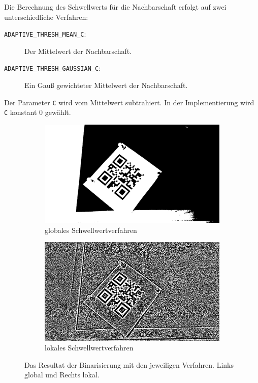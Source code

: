 Die Berechnung des Schwellwerts für die Nachbarschaft erfolgt auf zwei unterschiedliche Verfahren:
\begin{description}
	\item[\texttt{ADAPTIVE\_THRESH\_MEAN\_C}:] Der Mittelwert der Nachbarschaft.
	\item[\texttt{ADAPTIVE\_THRESH\_GAUSSIAN\_C}:] Ein Gauß gewichteter Mittelwert der Nachbarschaft.
\end{description}

Der Parameter \texttt{C} wird vom Mittelwert subtrahiert. In der Implementierung wird \texttt{C} konstant $0$ gewählt.

\begin{figure}[h]
\centering
\begin{subfigure}[t]{0.48\textwidth}
\centering
\includegraphics[scale=0.12]{images/qrcode-adler-wand_1___BINARIZED___.jpg}
\caption{globales Schwellwertverfahren}
\end{subfigure}%
\begin{subfigure}[t]{0.48\textwidth}
\centering
\includegraphics[scale=0.12]{images/qrcode-adler-wand_2___BINARIZED___.jpg}
\caption{lokales Schwellwertverfahren}
\end{subfigure}
\caption{Das Resultat der Binarisierung mit den jeweiligen Verfahren. Links global und Rechts lokal.}
\end{figure}